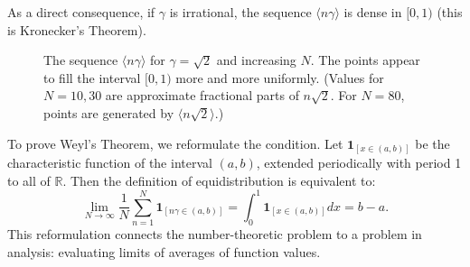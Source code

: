\documentclass[12pt]{article}
\newcommand{\R}{\mathbb{R}}
\begin{document}
As a direct consequence, if $\gamma$ is irrational, the sequence $\langle n\gamma \rangle$ is dense in $[0,1)$ (this is Kronecker's Theorem).

\begin{figure}[h!]
\centering
{}
\caption{The sequence $\langle n\gamma \rangle$ for $\gamma = \sqrt{2}$ and increasing $N$. The points appear to fill the interval $[0,1)$ more and more uniformly. (Values for $N=10,30$ are approximate fractional parts of $n\sqrt{2}$. For $N=80$, points are generated by $\langle n\sqrt{2} \rangle$.)}
\label{fig:weyl_points}
\end{figure}

To prove Weyl's Theorem, we reformulate the condition. Let $\mathbf{1}_{[x \in (a,b)]}$ be the characteristic function of the interval $(a,b)$, extended periodically with period 1 to all of $\R$. Then the definition of equidistribution is equivalent to:
$$ \lim_{N\to\infty} \frac{1}{N} \sum_{n=1}^N \mathbf{1}_{[n\gamma \in (a,b)]} = \int_0^1 \mathbf{1}_{[x \in (a,b)]} dx = b-a. $$
This reformulation connects the number-theoretic problem to a problem in analysis: evaluating limits of averages of function values.
\end{document}
